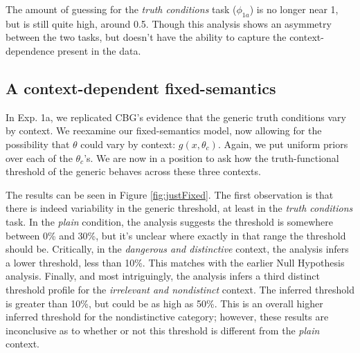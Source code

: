 \documentclass[10pt,letterpaper]{article}
\begin{document}
The amount of guessing for the \emph{truth conditions} task ($\phi_{1a}$) is no longer near 1, but is still quite high, around 0.5. Though this analysis shows an asymmetry between the two tasks, but doesn't have the ability to capture the context-dependence present in the data. 



\subsection{A context-dependent fixed-semantics}

In Exp. 1a, we replicated CBG's evidence that the generic truth conditions vary by context. We reexamine our fixed-semantics model, now allowing for the possibility that $\theta$ could vary by context: $g(x,\theta_{c})$.
Again, we put uniform priors over each of the $\theta_{c}$'s. We are now in a position to ask how the truth-functional threshold of the generic behaves across these three contexts. 


The results can be seen in Figure \ref{fig:justFixed}. The first observation is that there is indeed variability in the generic threshold, at least in the \emph{truth conditions} task. In the \emph{plain} condition, the analysis suggests the threshold is somewhere between 0\% and 30\%, but it's unclear where exactly in that range the threshold should be. Critically, in the \emph{dangerous and distinctive} context, the analysis infers a lower threshold, less than 10\%. This matches with the earlier Null Hypothesis analysis. Finally, and most intriguingly, the analysis infers a third distinct threshold profile for the \emph{irrelevant and nondistinct} context.  The inferred threshold is greater than 10\%, but could be as high as 50\%. This is an overall higher inferred threshold for the nondistinctive category; however, these results are inconclusive as to whether or not this threshold is different from the \emph{plain} context.
\end{document}
